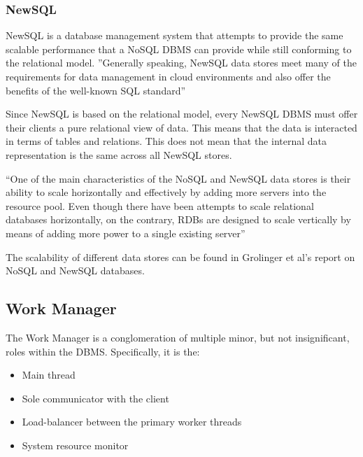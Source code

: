 \documentclass[letterpaper, 11pt]{article}
\begin{document}
\subsubsection{NewSQL}
NewSQL is a database management system that attempts to provide
the same scalable performance that a NoSQL DBMS can provide while still conforming to
the relational model. ''Generally speaking, NewSQL data stores meet many of the
requirements for data management in cloud environments and also offer the benefits of
the well-known SQL standard''\cite{grolinger2013data}
\par\vspace{\baselineskip}
Since NewSQL is based on the relational model, every NewSQL DBMS must offer their clients
a pure relational view of data. This means that the data is interacted in terms of tables
and relations. This does not mean that the internal data representation is the same across
all NewSQL stores.
\par\vspace{\baselineskip}
``One of the main characteristics of the NoSQL and NewSQL data stores is their ability to
scale horizontally and effectively by adding more servers into the resource pool. Even
though there have been attempts to scale relational databases horizontally, on the contrary,
RDBs are designed to scale vertically by means of adding more power to a single existing
server''\cite{grolinger2013data}
\par\vspace{\baselineskip}
The scalability of different data stores can be found in Grolinger et al's 
report on NoSQL and NewSQL databases\cite{grolinger2013data}.

\newpage

\subsection{Work Manager}
The Work Manager is a conglomeration of multiple minor, but not insignificant, roles
within the DBMS. Specifically, it is the:
\begin{itemize}
  \item Main thread
  \item Sole communicator with the client
  \item Load-balancer between the primary worker threads
  \item System resource monitor
\end{itemize}
\end{document}
